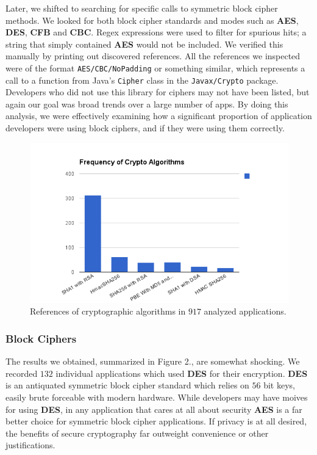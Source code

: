 \documentclass[11pt]{article}
\numberwithin{theorem}{subsection}
\begin{document}
  Later, we shifted to searching for specific calls to symmetric block cipher methods. We looked for both
block cipher standards and modes such as \textbf{AES}, \textbf{DES}, \textbf{CFB} and \textbf{CBC}. Regex expressions were used to filter
for spurious hits; a string that simply contained \textbf{AES} would not be included. We verified this manually by printing out discovered
references. All the references we inspected were of the format \texttt{AES/CBC/NoPadding} or something similar, which represents
a call to a function from Java's \texttt{Cipher} class in the \texttt{Javax/Crypto} package. Developers who did not use this library for
ciphers may not have been listed, but again our goal was broad trends over a large number of apps. By doing this analysis, we were effectively
examining how a significant proportion of application developers were using block ciphers, and if they were using them correctly.

\begin{figure}[H]
  \caption{References of cryptographic algorithms in $917$ analyzed applications.}
  \centering
  \includegraphics[scale=0.8]{fig1.png}
\end{figure}

\subsubsection{Block Ciphers}

The results we obtained, summarized in Figure 2., are somewhat shocking. We recorded $132$ individual applications which used
\textbf{DES} for their encryption. \textbf{DES} is an antiquated symmetric block cipher standard which relies on $56$ bit keys,
easily brute forceable with modern hardware. While developers may have moives for using \textbf{DES}, in any application that cares
at all about security \textbf{AES} is a far better choice for symmetric block cipher applications. If privacy is at all desired, 
the benefits of secure cryptography far outweight convenience or other justifications. 
\end{document}
